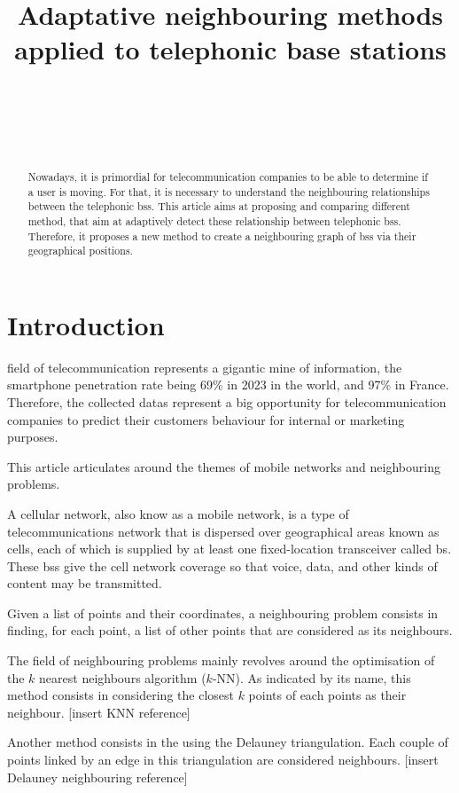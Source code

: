\documentclass[lettersize,journal,english]{IEEEtran}
\title{Adaptative neighbouring methods applied to telephonic base stations}
\author{\IEEEauthorblockN{Paul MÉHAUD}\\
\IEEEauthorblockA{\textit{Intern at CTU in Prague} \\
\textit{INSA Rouen Normandie}\\
paul.mehaud@insa-rouen.fr}\\
\and
\IEEEauthorblockN{Brendan SÉVELLEC}\\
\IEEEauthorblockA{\textit{Intern at CTU in Prague} \\
\textit{INSA Rouen Normandie}\\
brendan.sevellec@insa-rouen.fr}}
\begin{document}
\maketitle

\begin{abstract}
    Nowadays, it is primordial for telecommunication companies to be able to determine if a user is moving. For that, it is necessary to understand the neighbouring relationships between the telephonic \acrlong{bs}s. This article aims at proposing and comparing different method, that aim at adaptively detect these relationship between telephonic \acrlong{bs}s. Therefore, it proposes a new method to create a neighbouring graph of \acrlong{bs}s via their geographical positions.
\end{abstract}

\section{Introduction}
     field of telecommunication represents a gigantic mine of information, the smartphone penetration rate being 69\% in 2023 in the world, and 97\% in France. Therefore, the collected datas represent a big opportunity for telecommunication companies to predict their customers behaviour for internal or marketing purposes. 
    
    This article articulates around the themes of mobile networks and neighbouring problems. 

    A cellular network, also know as a mobile network, is a type of telecommunications network that is dispersed over geographical areas known as cells, each of which is supplied by at least one fixed-location transceiver called \acrfull{bs}. These \acrshort{bs}s give the cell network coverage so that voice, data, and other kinds of content may be transmitted.
    
    Given a list of points and their coordinates, a neighbouring problem consists in finding, for each point, a list of other points that are considered as its neighbours.

    The field of neighbouring problems mainly revolves around the optimisation of the $k$ nearest neighbours algorithm ($k$-NN).
    As indicated by its name, this method consists in considering the closest $k$ points of each points as their neighbour.
    [insert KNN reference]

    Another method consists in the using the Delauney triangulation. Each couple of points linked by an edge in this triangulation are considered neighbours.
    [insert Delauney neighbouring reference]
\end{document}
